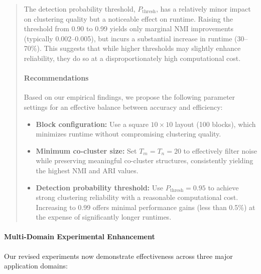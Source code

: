 \documentclass{ar2rc}
\theoremstyle{definition}
\theoremstyle{remark} %
\begin{document}
\begin{quote}
  The detection probability threshold, $P_{\text{thresh}}$, has a relatively minor impact on clustering quality but a noticeable effect on runtime. Raising the threshold from 0.90 to 0.99 yields only marginal NMI improvements (typically 0.002--0.005), but incurs a substantial increase in runtime (30--70\%). This suggests that while higher thresholds may slightly enhance reliability, they do so at a disproportionately high computational cost.

  \paragraph{Recommendations}
  Based on our empirical findings, we propose the following parameter settings for an effective balance between accuracy and efficiency:
  \begin{itemize}
    \item \textbf{Block configuration:} Use a square $10 \times 10$ layout (100 blocks), which minimizes runtime without compromising clustering quality.
    \item \textbf{Minimum co-cluster size:} Set $T_m = T_n = 20$ to effectively filter noise while preserving meaningful co-cluster structures, consistently yielding the highest NMI and ARI values.
    \item \textbf{Detection probability threshold:} Use $P_{\text{thresh}} = 0.95$ to achieve strong clustering reliability with a reasonable computational cost. Increasing to 0.99 offers minimal performance gains (less than 0.5\%) at the expense of significantly longer runtimes.
  \end{itemize}
\end{quote}



\paragraph{Multi-Domain Experimental Enhancement}

Our revised experiments now demonstrate effectiveness across three major application domains:
\end{document}
